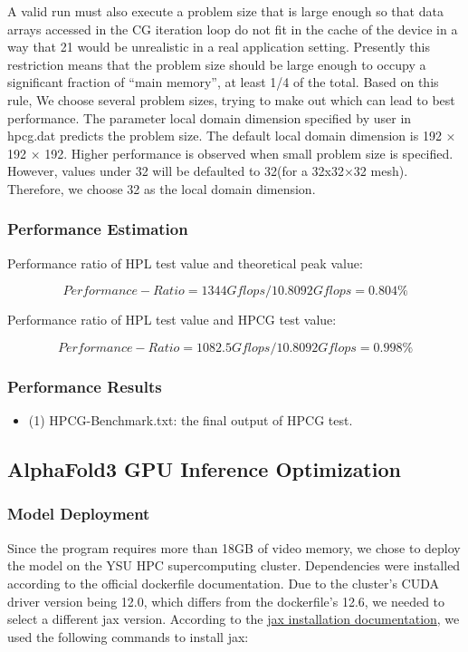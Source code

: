 \documentclass[a4paper,12pt]{article}
\begin{document}
A valid run must also execute a problem size that is large enough so that data arrays accessed in the CG iteration loop do not fit in the cache of the device in a way that 21 would be unrealistic in a real application setting. Presently this restriction means that the problem size should be large enough to occupy a significant fraction of “main memory”, at least 1/4 of the total. Based on this rule, We choose several problem sizes, trying to make out which can lead to best performance.
The parameter local domain dimension specified by user in hpcg.dat predicts the problem size. The default local domain dimension is 192 × 192 × 192. Higher performance is observed when small problem size is specified. However, values under 32 will be defaulted to 32(for a 32x32×32 mesh). Therefore, we choose 32 as the local domain dimension.

\subsubsection{Performance Estimation}

Performance ratio of HPL test value and theoretical peak value:

\begin{equation*}
Performance-Ratio = 1344Gflops/10.8092Gflops = 0.804\%
\end{equation*}

Performance ratio of HPL test value and HPCG test value:

\begin{equation*}
Performance-Ratio = 1082.5Gflops/10.8092Gflops = 0.998\%
\end{equation*}

\subsubsection{Performance Results}
\begin{itemize}
    \item (1) HPCG-Benchmark.txt: the final output of HPCG test.
\end{itemize}

\subsection{AlphaFold3 GPU Inference Optimization}

\subsubsection{Model Deployment}
Since the program requires more than 18GB of video memory, we chose to deploy the model on the YSU HPC supercomputing cluster. Dependencies were installed according to the official dockerfile documentation. Due to the cluster's CUDA driver version being 12.0, which differs from the dockerfile's 12.6, we needed to select a different jax version. According to the \href{https://docs.jax.dev/en/latest/installation.html#nvidia-gpu}{jax installation documentation}, we used the following commands to install jax:
\end{document}
